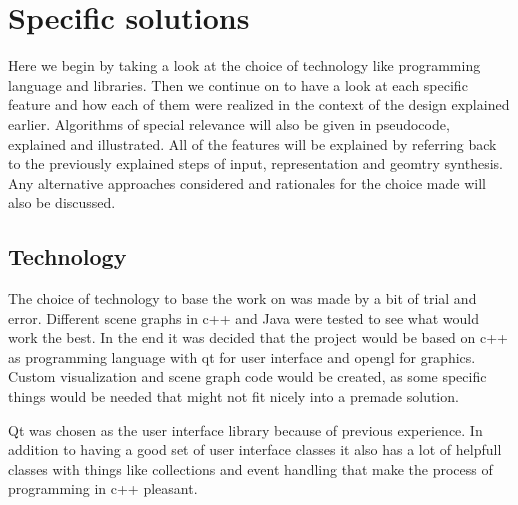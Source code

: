 \documentclass[a4paper,12pt]{report}
\begin{document}
\section{Specific solutions}
\label{subsec:indepth}

Here we begin by taking a look at the choice of technology like programming language and libraries. Then we continue on to have a look at each specific feature and how each of them were realized in the context of the design explained earlier. Algorithms of special relevance will also be given in pseudocode, explained and illustrated. All of the features will be explained by referring back to the previously explained steps of input, representation and geomtry synthesis. Any alternative approaches considered and rationales for the choice made will also be discussed.

\subsection{Technology}
The choice of technology to base the work on was made by a bit of trial and error. Different scene graphs in c++ and Java were tested to see what would work the best. In the end it was decided that the project would be based on c++ as programming language with qt for user interface and opengl for graphics. Custom visualization and scene graph code would be created, as some specific things would be needed that might not fit nicely into a premade solution. 

Qt was chosen as the user interface library because of previous experience. In addition to having a good set of user interface classes it also has a lot of helpfull classes with things like collections and event handling that make the process of programming in c++ pleasant.
\end{document}
